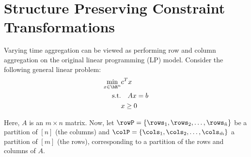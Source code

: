 \documentclass[smallextended,natbib]{svjour3}       %
\numberwithin{definition}{section}
\numberwithin{theorem}{section}
\numberwithin{proposition}{section}
\begin{document}


















\section{Structure Preserving Constraint Transformations}\label{appendix B}

Varying time aggregation can be viewed as performing row and column aggregation on the original linear programming (LP) model. Consider the following general linear problem:
\begin{align}
\label{eq:LP}
\min_{x \in \bR^{n}} &c^T x \\ 
\text{s.t.} &\quad Ax = b \\
&x \geq 0
\end{align}

Here, \(A\) is an \(m \times n\) matrix. Now, let \(\rowP = \{\rows_1, \rows_2, \ldots, \rows_{\tilde{n}}\}\) be a partition of \([n]\) (the columns) and \(\colP = \{\cols_1, \cols_2, \ldots, \cols_{\tilde{m}}\}\) a partition of \([m]\) (the rows), corresponding to a partition of the rows and columns of \(A\).
\end{document}
